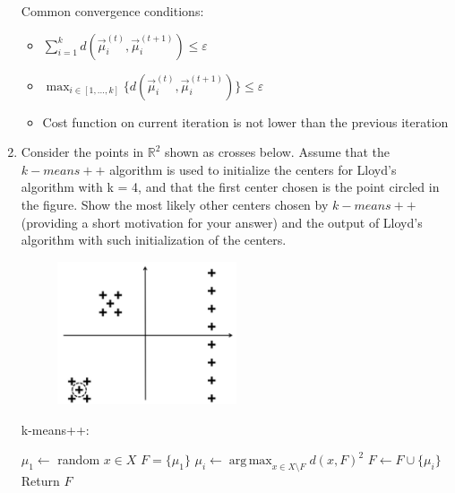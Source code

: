 \documentclass[a4paper,11pt,oneside]{book}
\DeclareMathOperator*{\argmax}{arg\,max}
\begin{document}
\begin{enumerate}
\begin{solution}
            Common convergence conditions:
            \begin{itemize}
            \item $\sum_{i=1}^k d(\vec{\mu}_i^{(t)}, \vec{\mu}_i^{(t+1)}) \leq \varepsilon$
            \item $\max_{i \in [1,...,k]}\{d(\vec{\mu}_i^{(t)}, \vec{\mu}_i^{(t+1)})\} \leq \varepsilon$
            \item Cost function on current iteration is not lower than the previous iteration
            \end{itemize}
            \end{solution}
        \item Consider the points in $\mathbb{R}^2$ shown as crosses below. Assume that the $k-means++$ algorithm is used to initialize the centers for Lloyd's algorithm with k = 4, and that the first center chosen is the point circled in the figure. Show the most likely other centers chosen by $k-means++$  (providing a short motivation for your answer) and the output of Lloyd's algorithm with such initialization of the centers.
        \begin{figure}[H]
            \centering
            \includegraphics[width=0.5\textwidth,height=0.5\textheight,keepaspectratio]{images/graph_4_1_Feb_2022.png}
        \end{figure}
        \begin{solution}
            k-means++:
            
            \begin{algorithmic}[1]
            \State $\mu_1 \gets$ random $x \in X$
            \State $F = \{\mu_1\}$
               \State $\mu_i \gets \argmax_{x \in X \setminus F} d(x,F)^2$ 
               \State $F \gets F \cup \{\mu_i\}$
            \EndFor
            \State Return $F$
            \end{algorithmic}
            

\end{solution}
\end{enumerate}
\end{document}
